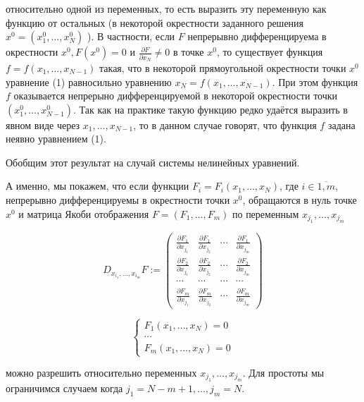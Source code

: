 \documentclass[a4paper,12pt]{article} %
\begin{document}
относительно одной из переменных, то есть выразить эту переменную как функцию от остальных (в некоторой окрестности заданного решения $x^{0}=\left(x_{1}^{0}, \ldots, x_{N}^{0}\right)$ ). В частности, если $F$ непрерывно дифференцируема в окрестности $x^{0}, F\left(x^{0}\right)=0$ и $\frac{\partial F}{\partial x_{N}} \neq 0$ в точке $x^{0}$, то существует функция $f=f\left(x_{1}, \ldots, x_{N-1}\right)$ такая, что в некоторой прямоугольной окрестности точки $x^{0}$ уравнение (1) равносильно уравнению $x_{N}=f\left(x_{1}, \ldots, x_{N-1}\right)$. При этом функция $f$ оказывается непрерыно дифференцируемой в некоторой окрестности точки $\left(x_{1}^{0}, \ldots, x_{N-1}^{0}\right)$. Так как на практике такую функцию редко удаётся выразить в явном виде через $x_{1}, \ldots, x_{N-1}$, то в данном случае говорят, что функция $f$ задана неявно уравнением (1).

Обобщим этот результат на случай системы нелинейных уравнений.

А именно, мы покажем, что если функции $F_{i}=F_{i}\left(x_{1}, \ldots, x_{N}\right)$, где $i \in \overline{1, m}$, непрерывно дифференцируемы в окрестности точки $x^{0}$, обращаются в нуль точке $x^{0}$ и матрица Якоби отображения $F=\left(F_{1}, \ldots, F_{m}\right)$ по переменным $x_{j_{1}}, \ldots, x_{j_{m}}$

$$
D_{x_{i_{1}}, \ldots, x_{i_{m}}} F:=\left(\begin{array}{cccc}
\frac{\partial F_{1}}{\partial x_{j_{1}}} & \frac{\partial F_{1}}{\partial x_{j_{2}}} & \cdots & \frac{\partial F_{1}}{\partial x_{j_{m}}} \\
\frac{\partial F_{2}}{\partial x_{j_{1}}} & \frac{\partial F_{2}}{\partial x_{j_{2}}} & \cdots & \frac{\partial F_{2}}{\partial x_{j_{m}}} \\
\cdots & \cdots & \cdots & \cdots \\
\frac{\partial F_{m}}{\partial x_{j_{1}}} & \frac{\partial F_{m}}{\partial x_{j_{2}}} & \cdots & \frac{\partial F_{m}}{\partial x_{j_{m}}}
\end{array}\right)
$$

$$
\left\{\begin{array}{l}
F_{1}\left(x_{1}, \ldots, x_{N}\right)=0 \\
\cdots \\
F_{m}\left(x_{1}, \ldots, x_{N}\right)=0
\end{array}\right.
$$

можно разрешить относительно переменных $x_{j_{1}}, \ldots, x_{j_{m}}$. Для простоты мы ограничимся случаем когда $j_{1}=N-m+1, \ldots, j_{m}=N$.
\end{document}
